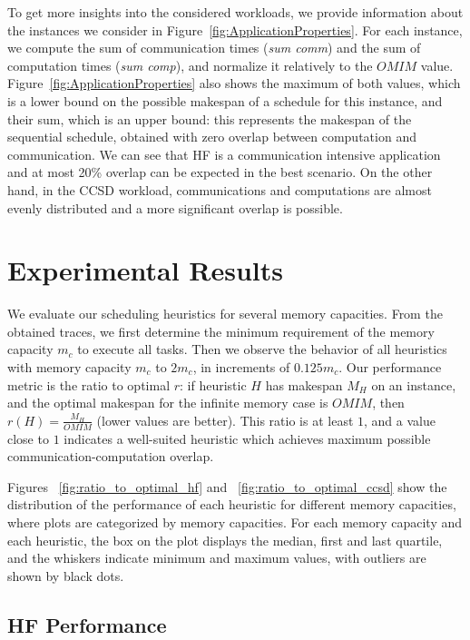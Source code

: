 \documentclass[sigconf]{acmart}
\begin{document}
{		\noindent To get more insights into the considered workloads, we provide  information about the instances we consider in Figure~\ref{fig:ApplicationProperties}. For each instance, we compute the sum of communication times (\textit{sum comm}) and the sum of computation times  (\textit{sum comp}), and normalize it relatively to the $OMIM$ value. Figure~\ref{fig:ApplicationProperties} also shows the maximum of both values, which is a lower bound on the possible makespan of a schedule for this instance, and their sum, which is an upper bound: this represents the makespan of the sequential schedule, obtained with zero overlap between computation and communication. We can see that HF is a communication intensive application and at most 20\% overlap can be expected in the best scenario. On the other hand, in the CCSD workload, communications and computations are almost evenly distributed and a more significant overlap is possible.
		
		
		\section{Experimental Results}
		\label{sec:expResults}
		We evaluate our scheduling heuristics for several memory capacities. From the obtained traces, we first determine the minimum requirement of the memory capacity $m_c$ to execute all tasks. Then we observe the behavior of all heuristics with memory capacity $m_c$ to $2m_c$, in increments of $0.125m_c$. Our performance metric is the ratio to optimal $r$: if heuristic $H$ has makespan $M_H$ on an instance, and the optimal makespan for the infinite memory case is $OMIM$, then $r(H)=\frac{M_H}{OMIM}$ (lower values are better). This ratio is at least $1$, and a value close to $1$ indicates a well-suited  heuristic which achieves maximum possible communication-computation overlap.
		
		Figures ~\ref{fig:ratio_to_optimal_hf} and ~\ref{fig:ratio_to_optimal_ccsd} show the distribution of the performance of each heuristic for different memory capacities, where plots are categorized by memory capacities. For each memory capacity and each heuristic, the box on the plot displays the median, first and last quartile, and the whiskers indicate minimum and maximum values, with outliers are shown by black dots.
		\subsection{HF Performance}	

}
\end{document}
